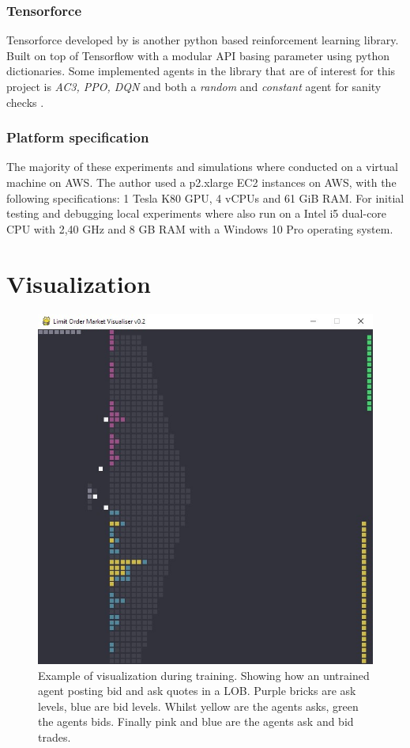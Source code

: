 \documentclass{kththesis}
\theoremstyle{definition}
\begin{document}
\subsubsection*{Tensorforce}
Tensorforce developed by \textcite{schaarschmidt2017tensorforce} is another python based reinforcement learning library. Built on top of Tensorflow with a modular API basing parameter using python dictionaries. Some implemented agents in the library that are of interest for this project is \textit{AC3, PPO, DQN} and both a \textit{random} and \textit{constant} agent for sanity checks \parencite{schaarschmidt2017tensorforce}.

\subsubsection*{Platform specification}
The majority of these experiments and simulations where conducted on a virtual machine on AWS. 
The author used a p2.xlarge EC2 instances on AWS, with the following specifications: 1 Tesla K80 GPU, 4 vCPUs and 61 GiB RAM. For initial testing and debugging local experiments where also run on a Intel i5 dual-core CPU with 2,40 GHz and 8 GB RAM with a Windows 10 Pro operating system. 


\section{Visualization}

\begin{figure}[H]
    \centering
    \includegraphics[scale=.4]{Imgs/lob_untrained_Moment.jpg}
    \caption{Example of visualization during training. Showing how an untrained agent posting bid and ask quotes in a LOB. Purple bricks are ask levels, blue are bid levels. Whilst yellow are the agents asks, green the agents bids. Finally pink and blue are the agents ask and bid trades.}
    \label{fig:v1}
\end{figure}
\end{document}
